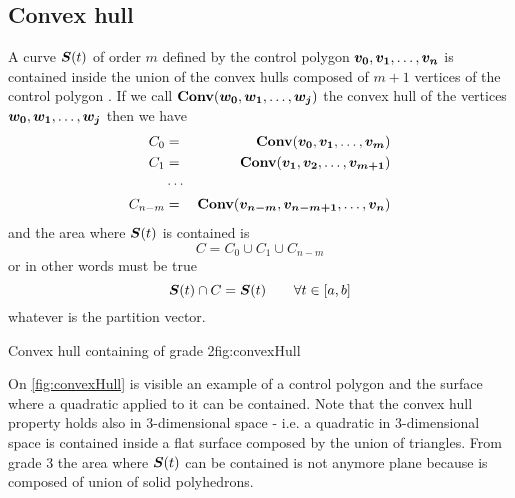 \documentclass[dissertation.tex]{subfiles}
\begin{document}
\subsection{Convex hull}\label{sec:convexHull}
A \bs curve $\boldsymbol{S}(t)$ of order $m$ defined by the control polygon
$\boldsymbol{v_0},\boldsymbol{v_1},\dots,\boldsymbol{v_n}$ is contained inside the union of the
convex hulls composed of $m+1$ vertices of the control polygon
\cite{farin}. If we
call $\mathbf{Conv}(\boldsymbol{w_0},\boldsymbol{w_1},\dots,\boldsymbol{w_j})$ the convex hull of the
vertices $\boldsymbol{w_0},\boldsymbol{w_1},\dots,\boldsymbol{w_j}$ then we have
\begin{eqnarray*}
  C_0&=&\mathbf{Conv}(\boldsymbol{v_0},\boldsymbol{v_1},\dots,\boldsymbol{v_{m}})\\
  C_1&=&\mathbf{Conv}(\boldsymbol{v_1},\boldsymbol{v_2},\dots,\boldsymbol{v_{m+1}})\\
  &\cdots&\\
  C_{n-m}&=&\mathbf{Conv}(\boldsymbol{v_{n-m}},\boldsymbol{v_{n-m+1}},\dots,\boldsymbol{v_{n}})\\
\end{eqnarray*}
and the area where $\boldsymbol{S}(t)$ is contained is
\begin{equation*}
  C=C_0\cup C_1\cup C_{n-m}
\end{equation*}
or in other words must be true
\begin{equation*}
  \boldsymbol{S}(t)\cap C =\boldsymbol{S}(t)\qquad \forall t\in[a,b]
\end{equation*}
whatever is the partition vector.

\begin{myfig}{Convex hull containing \bs of grade 2}{fig:convexHull}
\end{myfig}
On \cref{fig:convexHull} is visible an example of a control polygon
and the surface where a quadratic \bs applied to
it can be contained. Note that the convex hull property holds also in
3-dimensional
space - i.e. a quadratic \bs in 3-dimensional space is contained
inside a flat surface composed by the union of triangles. From grade 3
the area where $\boldsymbol{S}(t)$ can be contained is not anymore plane
because is composed of union of solid polyhedrons.
\end{document}
